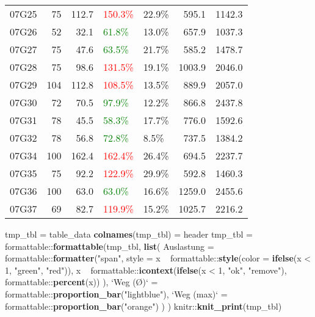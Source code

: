 \documentclass[a4paper]{article}
\newenvironment{Shaded}{\begin{snugshade}}{\end{snugshade}}
\newcommand{\KeywordTok}[1]{\textcolor[rgb]{0.13,0.29,0.53}{\textbf{{#1}}}}
\newcommand{\DataTypeTok}[1]{\textcolor[rgb]{0.13,0.29,0.53}{{#1}}}
\newcommand{\DecValTok}[1]{\textcolor[rgb]{0.00,0.00,0.81}{{#1}}}
\newcommand{\StringTok}[1]{\textcolor[rgb]{0.31,0.60,0.02}{{#1}}}
\newcommand{\NormalTok}[1]{{#1}}
\begin{document}
\begin{table}[ht]
\begin{tabular}{lrrllrr}
  07G25 & 75 & 112.7 & \textcolor{red}{150.3\%} & 22.9\% & 595.1 & 1142.3 \\ 
  07G26 & 52 & 32.1 & \textcolor{green}{61.8\%} & 13.0\% & 657.9 & 1037.3 \\ 
  07G27 & 75 & 47.6 & \textcolor{green}{63.5\%} & 21.7\% & 585.2 & 1478.7 \\ 
  07G28 & 75 & 98.6 & \textcolor{red}{131.5\%} & 19.1\% & 1003.9 & 2046.0 \\ 
  07G29 & 104 & 112.8 & \textcolor{red}{108.5\%} & 13.5\% & 889.9 & 2057.0 \\ 
  07G30 & 72 & 70.5 & \textcolor{green}{97.9\%} & 12.2\% & 866.8 & 2437.8 \\ 
  07G31 & 78 & 45.5 & \textcolor{green}{58.3\%} & 17.7\% & 776.0 & 1592.6 \\ 
  07G32 & 78 & 56.8 & \textcolor{green}{72.8\%} & 8.5\% & 737.5 & 1384.2 \\ 
  07G34 & 100 & 162.4 & \textcolor{red}{162.4\%} & 26.4\% & 694.5 & 2237.7 \\ 
  07G35 & 75 & 92.2 & \textcolor{red}{122.9\%} & 29.9\% & 592.8 & 1460.3 \\ 
  07G36 & 100 & 63.0 & \textcolor{green}{63.0\%} & 16.6\% & 1259.0 & 2455.6 \\ 
  07G37 & 69 & 82.7 & \textcolor{red}{119.9\%} & 15.2\% & 1025.7 & 2216.2 \\ 
   \bottomrule
\end{tabular}
\end{table}

\begin{Shaded}
\begin{Highlighting}[]
\NormalTok{tmp_tbl =}\StringTok{ }\NormalTok{table_data}
\KeywordTok{colnames}\NormalTok{(tmp_tbl) =}\StringTok{ }\NormalTok{header}
\NormalTok{tmp_tbl =}\StringTok{ }\NormalTok{formattable::}\KeywordTok{formattable}\NormalTok{(tmp_tbl,}
  \KeywordTok{list}\NormalTok{(}
      \DataTypeTok{Auslastung =} \NormalTok{formattable::}\KeywordTok{formatter}\NormalTok{(}\StringTok{"span"}\NormalTok{,}
        \DataTypeTok{style =} \NormalTok{x ~}\StringTok{ }\NormalTok{formattable::}\KeywordTok{style}\NormalTok{(}\DataTypeTok{color =} \KeywordTok{ifelse}\NormalTok{(x <}\StringTok{ }\DecValTok{1}\NormalTok{, }\StringTok{"green"}\NormalTok{, }\StringTok{"red"}\NormalTok{)),}
        \NormalTok{x ~}\StringTok{ }\NormalTok{formattable::}\KeywordTok{icontext}\NormalTok{(}\KeywordTok{ifelse}\NormalTok{(x <}\StringTok{ }\DecValTok{1}\NormalTok{, }\StringTok{"ok"}\NormalTok{, }\StringTok{"remove"}\NormalTok{), formattable::}\KeywordTok{percent}\NormalTok{(x))}
      \NormalTok{),}
      \StringTok{`}\DataTypeTok{Weg (Ø)}\StringTok{`} \NormalTok{=}\StringTok{ }\NormalTok{formattable::}\KeywordTok{proportion_bar}\NormalTok{(}\StringTok{"lightblue"}\NormalTok{),}
      \StringTok{`}\DataTypeTok{Weg (max)}\StringTok{`} \NormalTok{=}\StringTok{ }\NormalTok{formattable::}\KeywordTok{proportion_bar}\NormalTok{(}\StringTok{"orange"}\NormalTok{)}
    \NormalTok{)}
  \NormalTok{)}
\NormalTok{knitr::}\KeywordTok{knit_print}\NormalTok{(tmp_tbl)}
\end{Highlighting}
\end{Shaded}
\end{document}
